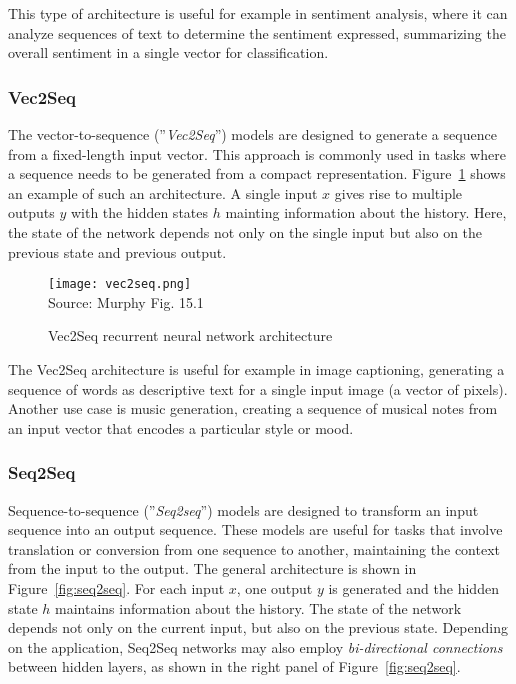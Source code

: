 This type of architecture is useful for example in sentiment analysis, where it can analyze sequences of text to determine the sentiment expressed, summarizing the overall sentiment in a single vector for classification.

\subsubsection*{Vec2Seq}

The vector-to-sequence (''\emph{Vec2Seq}'') models are designed to generate a sequence from a fixed-length input vector. This approach is commonly used in tasks where a sequence needs to be generated from a compact representation. Figure~\ref{fig:vec2seq} shows an example of such an architecture. A single input $x$ gives rise to multiple outputs $y$ with the hidden states $h$ mainting information about the history. Here, the state of the network depends not only on the single input but also on the previous state and previous output. 

\begin{figure}
\centering
\texttt{[image: vec2seq.png]} \\

\scriptsize Source: Murphy Fig. 15.1
\caption{Vec2Seq recurrent neural network architecture}
\label{fig:vec2seq}
\end{figure}

The Vec2Seq architecture is useful for example in image captioning, generating a sequence of words as descriptive text for a single input image (a vector of pixels). Another use case is music generation, creating a sequence of musical notes from an input vector that encodes a particular style or mood.

\subsubsection*{Seq2Seq}

Sequence-to-sequence (''\emph{Seq2seq}'') models are designed to transform an input sequence into an output sequence. These models are useful for tasks that involve translation or conversion from one sequence to another, maintaining the context from the input to the output. The general architecture is shown in Figure~\ref{fig:seq2seq}. For each input $x$, one output $y$ is generated and the hidden state $h$ maintains information about the history. The state of the network depends not only on the current input, but also on the previous state. Depending on the application, Seq2Seq networks may also employ \emph{bi-directional connections} between hidden layers, as shown in the right panel of Figure~\ref{fig:seq2seq}.

